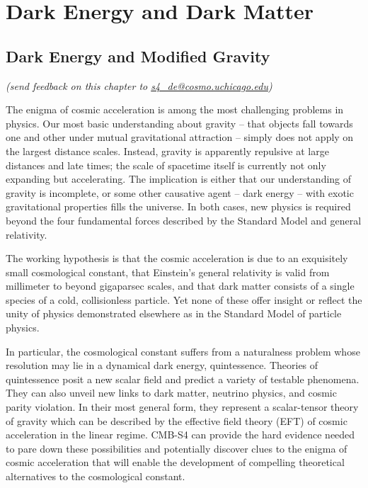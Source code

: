 
\chapter{Dark Energy and Dark Matter}

\section{Dark Energy and Modified Gravity}

\begin{center}
{\small \it (send feedback on this chapter to \href{mailto:s4_de@cosmo.uchicago.edu}{s4\_de@cosmo.uchicago.edu})}
\end{center}



The enigma of cosmic acceleration is among the most challenging problems in physics. Our most basic understanding about gravity -- that objects fall towards one and other under mutual gravitational attraction -- simply does not apply on the largest distance scales. Instead, gravity is apparently repulsive at large distances and late times; the scale of spacetime itself is currently not only expanding but accelerating. The implication is either that our understanding of gravity is incomplete, or some other causative agent -- dark energy -- with exotic gravitational properties fills the universe. In both cases, new physics is required beyond the four fundamental forces described by the Standard Model and general relativity.

The working hypothesis is that the cosmic acceleration is due to an exquisitely small cosmological constant, that Einstein's general relativity is valid from millimeter to beyond gigaparsec scales, and that dark matter consists of a single species of a cold, collisionless particle. Yet none of these offer insight or reflect the unity of physics demonstrated elsewhere as in the Standard Model of particle physics.

In particular, the cosmological constant suffers from a naturalness problem whose resolution may lie in a dynamical dark energy, quintessence. Theories of quintessence posit a new scalar field and predict a variety of testable phenomena.  They can also unveil new links to dark matter, neutrino physics, and cosmic parity violation. In their most general form, they represent
a scalar-tensor theory of gravity which can be described by  the effective field theory (EFT) of cosmic acceleration in the linear regime. 
CMB-S4 can provide the hard evidence  needed to pare down these possibilities and potentially discover clues to the enigma of cosmic acceleration that will enable the development of  compelling theoretical 
alternatives to the cosmological constant.


